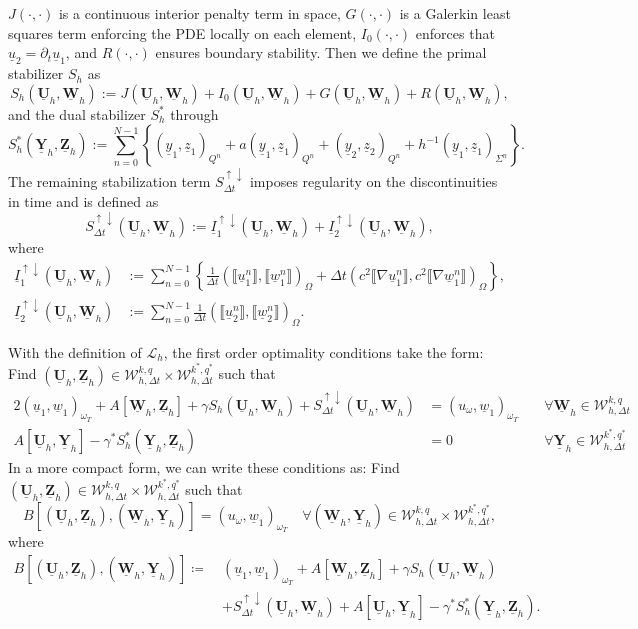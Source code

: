 \documentclass[sn-mathphys-num]{sn-jnl}
\numberwithin{equation}{section}
\newcommand{\jump}[1]{\llbracket#1\rrbracket}
\newcommand{\cL}{\mathcal{L}}
\newcommand{\ProdFullyDiscrSpace}[2]{ \mathcal{W}^{ {#1},{#2}}_{h, \Delta t  } }
\newcommand{\Uh}{\underline{\mathbf{U}}_h}
\newcommand{\Yh}{\underline{\mathbf{Y}}_h}
\newcommand{\Zh}{\underline{\mathbf{Z}}_h}
\newcommand{\Wh}{\underline{\mathbf{W}}_h}
\newcommand{\ul}{\underline{u}}
\newcommand{\yl}{\underline{y}}
\newcommand{\zl}{\underline{z}}
\newcommand{\wl}{\underline{w}}
\newcommand{\Sud}{S^{\uparrow \downarrow}_{\Delta t}}
\newcommand{\dt}{\partial_t}
\begin{document}
$J(\cdot,\cdot)$ is a continuous interior penalty term in space, $G(\cdot,\cdot)$ is a Galerkin least squares term enforcing the PDE locally on each element, $I_0(\cdot,\cdot)$ enforces that $\ul_2 = \dt \ul_1$, and $R(\cdot,\cdot)$ ensures boundary stability. 
Then we define the primal stabilizer $S_h$ as 
\begin{equation}\label{eq:primalStab}
    S_h(\Uh,\Wh) := J(\Uh,\Wh) + I_0(\Uh,\Wh) + G(\Uh,\Wh) + R(\Uh,\Wh), 
\end{equation}
and the dual stabilizer $S_h^\ast$ through 
\begin{equation}
    S_h^\ast(\Yh,\Zh) := \sum_{n = 0}^{N-1} \left\{ (\yl_1,\zl_1)_{Q^n} + a(\yl_1,\zl_1)_{Q^n} + (\yl_2,\zl_2)_{Q^n} + h^{-1} (\yl_1,\zl_1)_{\Sigma^n} \right\}.
\end{equation}
The remaining stabilization term $\Sud$ imposes regularity on the discontinuities in time and is defined as 
\begin{equation}
    \Sud (\Uh,\Wh) := \underline{I}_1^{\uparrow \downarrow}(\Uh,\Wh) + \underline{I}_2^{\uparrow \downarrow}(\Uh,\Wh),
\end{equation}
where 
\begin{align*}
    \underline{I}_1^{\uparrow \downarrow}(\Uh,\Wh) &:= \sum_{n = 0}^{N-1} \left\{ \frac{1}{\Delta t} (\jump{\ul_1^n},\jump{\wl_1^n})_{\Omega} + \Delta t (c^2 \jump{\nabla \ul_1^n},c^2 \jump{\nabla \wl_1^n})_{\Omega}\right\}, \\
    \underline{I}_2^{\uparrow \downarrow}(\Uh,\Wh) &:= \sum_{n = 0}^{N-1} \frac{1}{\Delta t} (\jump{\ul_2^n},\jump{\wl_2^n})_{\Omega}.
\end{align*}

\noindent With the definition of $\cL_h$, the first order optimality conditions take the form: Find $(\Uh,\Zh) \in \ProdFullyDiscrSpace{k}{q} \times \ProdFullyDiscrSpace{k^\ast}{q^\ast}$ such that 
\begin{alignat*}{2}
    (\ul_1,\wl_1)_{\omega_T} \! + \! A[\Wh,\Zh] + \gamma S_h(\Uh,\Wh) + \Sud(\Uh,\Wh) &= (u_{\omega},\wl_1)_{\omega_T} \ &&\forall \Wh \in \ProdFullyDiscrSpace{k}{q} \\
    A[\Uh,\Yh] - \gamma^{\ast} S_h^\ast(\Yh,\Zh) &= 0 \ &&\forall \Yh \in \ProdFullyDiscrSpace{k^\ast}{q^\ast} 
\end{alignat*}
In a more compact form, we can write these conditions as: Find $(\Uh,\Zh) \in \ProdFullyDiscrSpace{k}{q} \times \ProdFullyDiscrSpace{k^\ast}{q^\ast}$ such that
\begin{equation}\label{eq:discreteProblem}
    B[(\Uh,\Zh),(\Wh,\Yh)] = (u_{\omega},\wl_1)_{\omega_T} \quad \forall (\Wh,\Yh) \in \ProdFullyDiscrSpace{k}{q} \times \ProdFullyDiscrSpace{k^\ast}{q^\ast},
\end{equation}
where 
\begin{equation}
    \begin{aligned}
        B[(\Uh,\Zh),(\Wh,\Yh)] \coloneqq \ &(\ul_1,\wl_1)_{\omega_T} + A[\Wh,\Zh]+ \gamma S_h(\Uh,\Wh) \\
        &+  \Sud(\Uh,\Wh) + A[\Uh,\Yh] - \gamma^{\ast} S_h^\ast(\Yh,\Zh).
    \end{aligned}
\end{equation}
\end{document}
